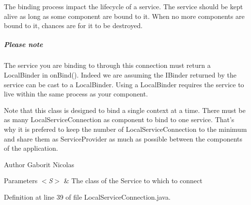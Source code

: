 The binding process impact the lifecycle of a service. The service should be kept alive as long as some component are bound to it. When no more components are bound to it, chances are for it to be destroyed.

\subparagraph*{Please note}

The service you are binding to through this connection must return a Local\-Binder in {\ttfamily on\-Bind()}. Indeed we are assuming the I\-Binder returned by the service can be cast to a Local\-Binder. Using a Local\-Binder requires the service to live within the same process as your component.

Note that this class is designed to bind a single context at a time. There must be as many Local\-Service\-Connection as component to bind to one service. That's why it is prefered to keep the number of Local\-Service\-Connection to the minimum and share them as Service\-Provider as much as possible between the components of the application.

\begin{DoxyAuthor}{Author}
Gaborit Nicolas
\end{DoxyAuthor}

\begin{DoxyParams}{Parameters}
{\em $<$\-S$>$} & The class of the Service to which to connect \\
\hline
\end{DoxyParams}


Definition at line 39 of file Local\-Service\-Connection.\-java.



